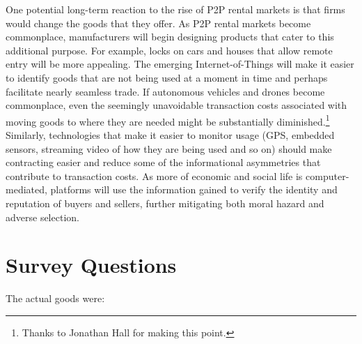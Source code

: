 \documentclass[12pt]{article}
\begin{document}
One potential long-term reaction to the rise of P2P rental markets is that firms would change the goods that they offer. 
As P2P rental markets become commonplace, manufacturers will begin designing products that cater to this additional purpose. 
For example, locks on cars and houses that allow remote entry will be more appealing. 
The emerging Internet-of-Things will make it easier to identify goods that are not being used at a moment in time and perhaps facilitate nearly seamless trade.
If autonomous vehicles and drones become commonplace, even the seemingly unavoidable transaction costs associated with moving goods to where they are needed might be substantially diminished.\footnote{
  Thanks to Jonathan Hall for making this point.
}
Similarly, technologies that make it easier to monitor usage (GPS, embedded sensors, streaming video of how they are being used and so on) should make contracting easier and reduce some of the informational asymmetries that contribute to transaction costs. 
As more of economic and social life is computer-mediated, platforms will use the information gained to verify the identity and reputation of buyers and sellers, further mitigating both moral hazard and adverse selection.  





\newpage 

\appendix 

\section{Survey Questions \label{sec:survey}} 

The actual goods were: 
\end{document}
